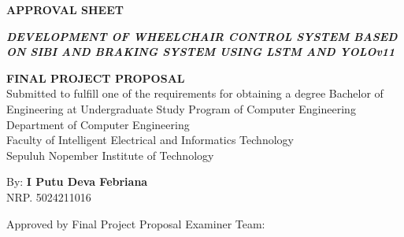 \begin{center}
	\large
  \textbf{APPROVAL SHEET}
\end{center}
\thispagestyle{empty}

\begin{center}
  \textbf{\emph{DEVELOPMENT OF WHEELCHAIR CONTROL SYSTEM BASED ON SIBI AND BRAKING SYSTEM USING LSTM AND YOLOv11}}
\end{center}
\begingroup
\small
  \begin{center}
    \textbf{FINAL PROJECT PROPOSAL} \\
    Submitted to fulfill one of the requirements for obtaining a degree
    Bachelor of Engineering at 
    Undergraduate Study Program of Computer Engineering \\
    Department of Computer Engineering \\
    Faculty of Intelligent Electrical and Informatics Technology \\
    Sepuluh Nopember Institute of Technology
  \end{center}

  \begin{center}
    By: \textbf{I Putu Deva Febriana} \\
    NRP. 5024211016
  \end{center}

  \begin{center}
    Approved by Final Project Proposal Examiner Team:
  \end{center}
  \begingroup
    \setlength{\tabcolsep}{0pt}

